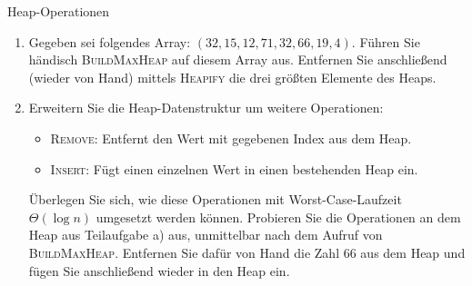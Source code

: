 \documentclass[11pt,a4paper]{article}
\begin{document}
\thispagestyle{empty}





\begin{aufgabe}{1}{Heap-Operationen}
    \begin{enumerate}[label=\alph*)]
        \item \label{it:ex} Gegeben sei folgendes Array: $(32, 15, 12, 71, 32, 66, 19, 4)$. Führen Sie händisch \textsc{BuildMaxHeap} auf diesem Array aus. Entfernen Sie anschließend (wieder von Hand) mittels \textsc{Heapify} die drei größten Elemente des Heaps.
        \item Erweitern Sie die Heap-Datenstruktur um weitere Operationen:
        \begin{itemize}
            \item \textsc{Remove}: Entfernt den Wert mit gegebenen Index aus dem Heap.
            \item \textsc{Insert}: Fügt einen einzelnen Wert in einen bestehenden Heap ein.
        \end{itemize}
        Überlegen Sie sich, wie diese Operationen mit Worst-Case-Laufzeit $\Theta(\log n)$ umgesetzt werden können.
        Probieren Sie die Operationen an dem Heap aus Teilaufgabe a) aus, unmittelbar nach dem Aufruf von \textsc{BuildMaxHeap}.
        Entfernen Sie dafür von Hand die Zahl 66 aus dem Heap und fügen Sie anschließend wieder in den Heap ein.
    \end{enumerate}
\end{aufgabe}
\end{document}
